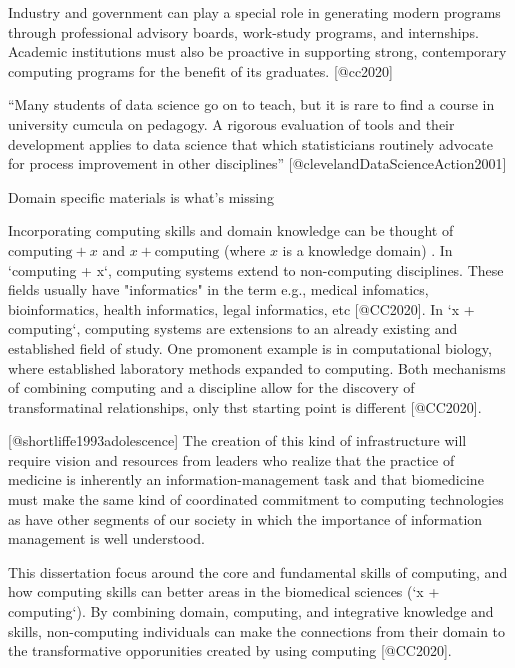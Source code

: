 \documentclass[../main.tex]{subfiles}
\begin{document}
        Industry and government can play a special role in generating modern programs through
        professional advisory boards, work-study programs, and internships.
        Academic institutions must also be proactive in
        supporting strong, contemporary computing programs for the benefit of its graduates. [@cc2020]

        ``Many students of data science
        go on to teach, but it is rare to find a course in university cumcula on pedagogy.
        A
        rigorous evaluation
        of tools and their development applies to data science that which statisticians routinely advocate for
        process improvement in other disciplines'' [@clevelandDataScienceAction2001]

        Domain specific materials is what's missing

        Incorporating computing skills and domain knowledge can be thought of
        $\text{computing} + x$ and $x + \text{computing}$ (where $x$ is a knowledge domain)
        \cite{cc2020}.
        In `computing + x`, computing systems extend to non-computing disciplines.
        These fields usually have "informatics" in the term
        e.g., medical infomatics, bioinformatics, health informatics, legal informatics, etc [@CC2020].
        In `x + computing`,
        computing systems are extensions to an already existing and established field of study.
        One promonent example is in computational biology,
        where established laboratory methods expanded to computing.
        Both mechanisms of combining computing and a discipline allow for the discovery of transformatinal relationships,
        only thst starting point is different [@CC2020].

        [@shortliffe1993adolescence]
        The creation of this kind of infrastructure will require vision and resources from leaders who realize that the practice of medicine is inherently an information-management task and that biomedicine must make the same kind of coordinated commitment to computing technologies as have other segments of our society in which the importance of information management is well understood.

        This dissertation focus around the core and fundamental skills
        of computing, and how computing skills can better areas in the biomedical sciences (`x + computing`).
        By combining domain, computing, and integrative knowledge and skills,
        non-computing individuals can make the connections from their domain to the transformative opporunities
        created by using computing [@CC2020].
\end{document}
